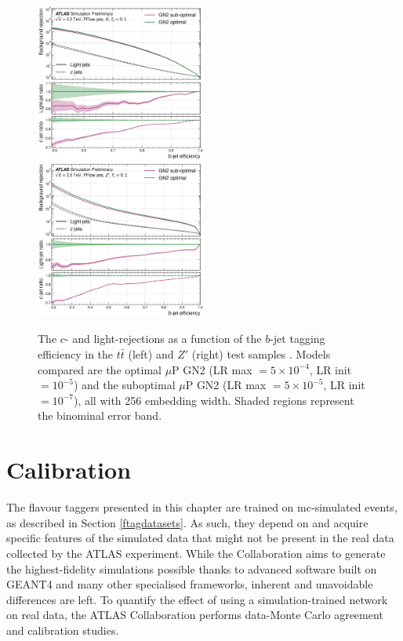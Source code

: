 \begin{center}
  \begin{figure}[h!]
  \centerline{
  \includegraphics[width=0.50\textwidth]{Images/FTAG/GN/HPO/thesis_roc/roc_ttbar.png}
  \includegraphics[width=0.50\textwidth]{Images/FTAG/GN/HPO/thesis_roc/roc_zp.png}
  }
  \caption{The $c$- and light-rejections as a function of the $b$-jet tagging efficiency in the $t\bar{t}$ (left) and $Z'$ (right) test samples \cite{publicplotMUP}. Models compared are the optimal $\mu$P GN2 (LR max $= 5\times 10^{-4}$, LR init $= 10^{-5}$) and the suboptimal $\mu$P GN2 (LR max $= 5 \times 10^{-5}$, LR init $= 10^{-7}$), all with 256 embedding width. Shaded regions represent the binominal error band.}
  \label{fig:rocmupGN2}
  \end{figure}
\end{center}

\vspace{-1.5cm}
\section{Calibration}\label{chap-calibration}
The flavour taggers presented in this chapter are trained on \gls{mc}-simulated events, as described in Section \ref{ftagdatasets}. As such, they depend on and acquire specific features of the simulated data that might not be present in the real data collected by the ATLAS experiment. While the Collaboration aims to generate the highest-fidelity simulations possible thanks to advanced software built on GEANT4 \cite{Agostinelli:602040} and many other specialised frameworks, inherent and unavoidable differences are left. To quantify the effect of using a simulation-trained network on real data, the ATLAS Collaboration performs data-Monte Carlo agreement and calibration studies. \\

